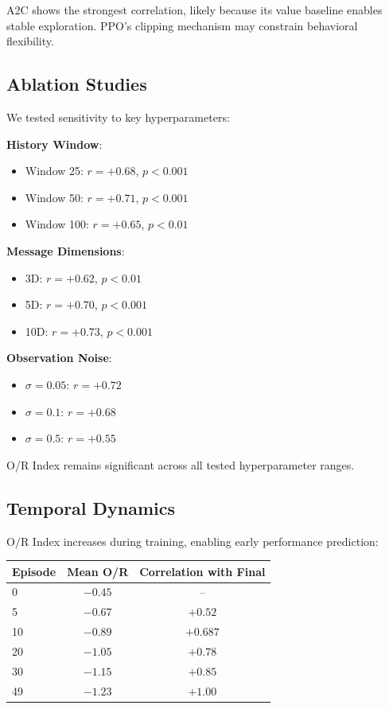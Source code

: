 \documentclass[twoside]{article}
\begin{document}
A2C shows the strongest correlation, likely because its value baseline enables stable exploration. PPO's clipping mechanism may constrain behavioral flexibility.

\subsection{Ablation Studies}

We tested sensitivity to key hyperparameters:

\textbf{History Window}:
\begin{itemize}
    \item Window 25: $r = +0.68$, $p < 0.001$
    \item Window 50: $r = +0.71$, $p < 0.001$
    \item Window 100: $r = +0.65$, $p < 0.01$
\end{itemize}

\textbf{Message Dimensions}:
\begin{itemize}
    \item 3D: $r = +0.62$, $p < 0.01$
    \item 5D: $r = +0.70$, $p < 0.001$
    \item 10D: $r = +0.73$, $p < 0.001$
\end{itemize}

\textbf{Observation Noise}:
\begin{itemize}
    \item $\sigma = 0.05$: $r = +0.72$
    \item $\sigma = 0.1$: $r = +0.68$
    \item $\sigma = 0.5$: $r = +0.55$
\end{itemize}

O/R Index remains significant across all tested hyperparameter ranges.

\subsection{Temporal Dynamics}

O/R Index increases during training, enabling early performance prediction:

\begin{center}
\begin{tabular}{lcc}
\toprule
\textbf{Episode} & \textbf{Mean O/R} & \textbf{Correlation with Final} \\
\midrule
0 & $-0.45$ & -- \\
5 & $-0.67$ & $+0.52$ \\
10 & $-0.89$ & $+0.687$ \\
20 & $-1.05$ & $+0.78$ \\
30 & $-1.15$ & $+0.85$ \\
49 & $-1.23$ & $+1.00$ \\
\bottomrule
\end{tabular}
\end{center}
\end{document}
